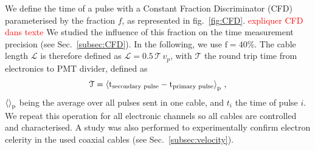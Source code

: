We define the time of a pulse with a Constant Fraction Discriminator (CFD) parameterised by the fraction $f$, as represented in fig.~\ref{fig:CFD}.
\textcolor{red}{expliquer CFD dans texte}
We studied the influence of this fraction on the time measurement precision (see Sec.~\ref{subsec:CFD}).
In the following, we use $\text{f} = 40\%$.
The cable length $\mathcal{L}$ is therefore defined as $\mathcal{L}= 0.5\,\mathcal{T}\,v_{p}$, with $\mathcal{T}$ the round trip time from electronics to PMT divider, defined as
\begin{equation}
\mathcal{T} = \braket{\text{t}_{\text{secondary pulse}}-\text{t}_{\text{primary pulse}}}_{\text{p}} \, \text{,}
\end{equation}
$\braket{}_{\text{p}}$ being the average over all pulses sent in one cable, and $t_{i}$ the time of pulse $i$.
We repeat this operation for all electronic channels so all cables are controlled and characterised.
A study was also performed to experimentally confirm electron celerity in the used coaxial cables (see Sec.~\ref{subsec:velocity}).


